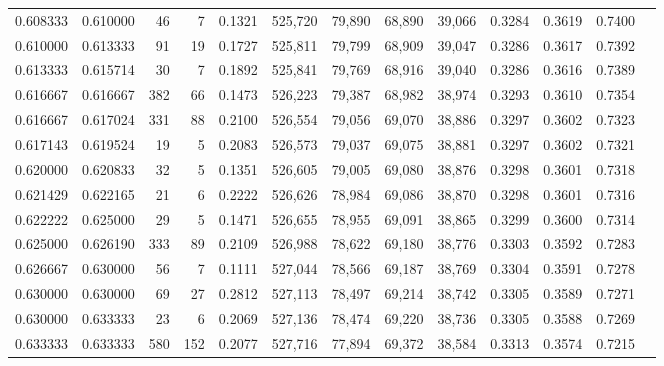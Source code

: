 \begin{tabular}{rrrrrrrrrrrrr}
0.608333 & 0.610000 &     46 &      7 &                                     0.1321 & 525,720 &  79,890 &  68,890 &  39,066 & 0.3284 & 0.3619 & 0.7400 \\
0.610000 & 0.613333 &     91 &     19 &                                     0.1727 & 525,811 &  79,799 &  68,909 &  39,047 & 0.3286 & 0.3617 & 0.7392 \\
0.613333 & 0.615714 &     30 &      7 &                                     0.1892 & 525,841 &  79,769 &  68,916 &  39,040 & 0.3286 & 0.3616 & 0.7389 \\
0.616667 & 0.616667 &    382 &     66 &                                     0.1473 & 526,223 &  79,387 &  68,982 &  38,974 & 0.3293 & 0.3610 & 0.7354 \\
0.616667 & 0.617024 &    331 &     88 &                                     0.2100 & 526,554 &  79,056 &  69,070 &  38,886 & 0.3297 & 0.3602 & 0.7323 \\
0.617143 & 0.619524 &     19 &      5 &                                     0.2083 & 526,573 &  79,037 &  69,075 &  38,881 & 0.3297 & 0.3602 & 0.7321 \\
0.620000 & 0.620833 &     32 &      5 &                                     0.1351 & 526,605 &  79,005 &  69,080 &  38,876 & 0.3298 & 0.3601 & 0.7318 \\
0.621429 & 0.622165 &     21 &      6 &                                     0.2222 & 526,626 &  78,984 &  69,086 &  38,870 & 0.3298 & 0.3601 & 0.7316 \\
0.622222 & 0.625000 &     29 &      5 &                                     0.1471 & 526,655 &  78,955 &  69,091 &  38,865 & 0.3299 & 0.3600 & 0.7314 \\
0.625000 & 0.626190 &    333 &     89 &                                     0.2109 & 526,988 &  78,622 &  69,180 &  38,776 & 0.3303 & 0.3592 & 0.7283 \\
0.626667 & 0.630000 &     56 &      7 &                                     0.1111 & 527,044 &  78,566 &  69,187 &  38,769 & 0.3304 & 0.3591 & 0.7278 \\
0.630000 & 0.630000 &     69 &     27 &                                     0.2812 & 527,113 &  78,497 &  69,214 &  38,742 & 0.3305 & 0.3589 & 0.7271 \\
0.630000 & 0.633333 &     23 &      6 &                                     0.2069 & 527,136 &  78,474 &  69,220 &  38,736 & 0.3305 & 0.3588 & 0.7269 \\
0.633333 & 0.633333 &    580 &    152 &                                     0.2077 & 527,716 &  77,894 &  69,372 &  38,584 & 0.3313 & 0.3574 & 0.7215 \\

\end{tabular}
